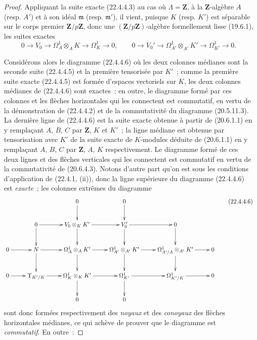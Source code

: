 \begin{proof}
Appliquant la suite exacte (22.4.4.3) au cas où $\Lambda=\mathbf Z$, à la
$\mathbf Z$-algèbre $A$ (resp. $A'$) et à son idéal $\mathfrak m$
(resp. $\mathfrak m'$), il vient, puisque $K$ (resp. $K'$) est séparable sur
le corps premier $\mathbf Z/p\mathbf Z$, donc une
$(\mathbf Z/p\mathbf Z)$-algèbre formellement lisse (19.6.1), les suites
exactes
\begin{equation}
\label{0.22.4.4.5-fr}
  0\longrightarrow V_0\longrightarrow\Omega^1_A\otimes_AK
  \longrightarrow\Omega^1_K\longrightarrow0,\qquad
  0\longrightarrow V_0'\longrightarrow\Omega^1_{A'}\otimes_{A'}K'
  \longrightarrow\Omega^1_{K'}\longrightarrow0.
  \tag{22.4.4.5}
\end{equation}

Considérons alors le diagramme (22.4.4.6) où les deux colonnes médianes sont
la seconde suite (22.4.4.5) et la première tensorisée par $K'$~; comme la
première suite exacte (22.4.4.5) est formée d'espaces vectoriels sur $K$,
les deux colonnes médianes de (22.4.4.6) sont exactes~; en outre, le
diagramme formé par ces colonnes et les flèches horizontales qui les
connectent est commutatif, en vertu de la démonstration de (22.4.4.2) et de
la commutativité du diagramme (20.5.11.3). La dernière ligne de (22.4.4.6)
est la suite exacte obtenue à partir de (20.6.1.1) en y remplaçant $A$, $B$,
$C$ par $\mathbf Z$, $K$ et $K'$~; la ligne médiane est obtenue par
tensorisation avec $K'$ de la suite exacte de $K$-modules déduite de
(20.6.1.1) en y remplaçant $A$, $B$, $C$ par $\mathbf Z$, $A$, $K$
respectivement. Le diagramme formé de ces deux lignes et des flèches
verticales qui les connectent est commutatif en vertu de la commutativité de
(20.6.4.3). Notons d'autre part qu'on est sous les conditions d'application
de (22.4.1, (ii)), donc la ligne supérieure du diagramme (22.4.4.6) est
\emph{exacte}~; les colonnes extrêmes du diagramme
\begin{equation}
\label{0.22.4.4.6-fr}
  \xymatrix{
    && 0 \ar[d] & 0 \ar[d] && \\
    & 0 \ar[r] \ar[d] & V_0\otimes_KK' \ar[r] \ar[d] & V_0' \ar[r] \ar[d] & 0 \ar[d] & \\
    0 \ar[r] & N \ar[r] \ar[d] & \Omega^1_A\otimes_AK' \ar[r] \ar[d] &
      \Omega^1_{A'}\otimes_{A'}K' \ar[r] \ar[d] &
      \Omega^1_{A'/A}\otimes_{A'}K' \ar[r] \ar[d] & 0 \\
    0 \ar[r] & \Upsilon_{K'/K} \ar[r] &
      \Omega^1_K\otimes_KK' \ar[r] \ar[d] & \Omega^1_{K'} \ar[r] \ar[d] &
      \Omega^1_{K'/K} \ar[r] & 0 \\
    && 0 & 0 &&
  }
  \tag{22.4.4.6}
\end{equation}
sont donc formées respectivement des \emph{noyaux} et des \emph{conoyaux} des flèches
horizontales médianes, ce qui achève de prouver que le diagramme est
\emph{commutatif}. En outre~:


\end{proof}
